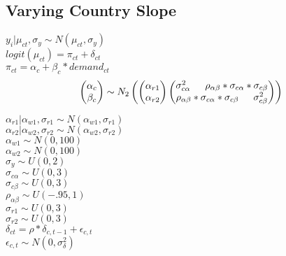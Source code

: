 \documentclass[12pt]{article}
\begin{document}
\subsection{Varying Country Slope}
 $ y_i|\mu_{ct},\sigma_y \sim N(\mu_{ct}, \sigma_y) $ \\
 $ logit(\mu_{ct})=  \pi_{ct} + \delta_{ct} $\\
 $ \pi_{ct} = \alpha_c + \beta_c*demand_{ct} $ \\
\begin{equation*}
  \begin{pmatrix}
  	\alpha_c \\
  	\beta_c 
  \end{pmatrix}
  \sim N_2
  \begin{pmatrix}
  	\begin{pmatrix}
    	\alpha_{r1} \\
    	\alpha_{r2}
  	\end{pmatrix}
  	\begin{pmatrix}
    	\sigma^2_{c\alpha}  $\indent$  \rho_{\alpha\beta}*\sigma_{c\alpha}*\sigma_{c\beta} \\
    	\rho_{\alpha\beta}*\sigma_{c\alpha}*\sigma_{c\beta} $\indent$ \sigma^2_{c\beta}
  	\end{pmatrix} 
  \end{pmatrix} \\
\end{equation*}

\noindent
 $ \alpha_{r1}|\alpha_{w1},\sigma_{r1} \sim N(\alpha_{w1},\sigma_{r1}) $ \\
 $ \alpha_{r2}|\alpha_{w2},\sigma_{r2} \sim N(\alpha_{w2},\sigma_{r2}) $ \\
 $ \alpha_{w1} \sim N(0,100) $ \\
 $ \alpha_{w2} \sim N(0,100) $ \\

\noindent
 $ \sigma_y \sim U(0,2) $ \\
 $\sigma_{c\alpha} \sim U(0,3) $ \\
 $\sigma_{c\beta} \sim U(0,3) $\\
 $\rho_{\alpha\beta} \sim U(-.95,1)$ \\
 $ \sigma_{r1} \sim U(0,3) $\\
 $ \sigma_{r2} \sim U(0,3) $\\

\noindent
 $ \delta_{ct} = \rho*\delta_{c,t-1}+\epsilon_{c,t} $ \\
 $ \epsilon_{c,t} \sim N(0,\sigma^2_\delta) $ \\ 
\newpage
\end{document}
